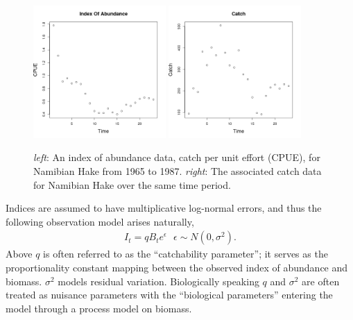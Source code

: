 \documentclass[11pt]{ucscthesis}
\begin{document}
{%
\begin{figure}[h!]
        \includegraphics[width=0.45\textwidth]{./plots/hakeIndex.png}
        \includegraphics[width=0.45\textwidth]{./plots/hakeCatch.png}
        \caption{\label{hakeData}
        \textit{left}: An index of abundance data, catch per unit effort (CPUE), for Namibian Hake from 1965 to 1987. %
        \textit{right}: The associated catch data for Namibian Hake over the same time period.
        }
\end{figure}

Indices are assumed to have multiplicative log-normal errors, and thus
the following observation model arises naturally,
\begin{align}
I_t = q B_t e^\epsilon ~~~ \epsilon\sim N(0, \sigma^2).
\end{align}
%
Above $q$ is often referred to as the ``catchability parameter''; it serves as the %
proportionality constant mapping between the observed index of abundance and biomass.
$\sigma^2$ models residual variation. Biologically speaking $q$ and $\sigma^2$
are often treated as nuisance parameters with the ``biological parameters''
entering the model through a process model on biomass.

}
\end{document}
